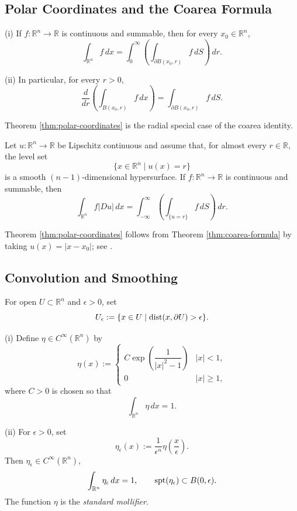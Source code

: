 \subsection{Polar Coordinates and the Coarea Formula}

\begin{theorem}
\label{thm:polar-coordinates}
(i) If $f:\mathbb R^n\to\mathbb R$ is continuous and summable, then for every $x_0\in\mathbb R^n$,
\[
\int_{\mathbb R^n}f\,dx
=\int_0^\infty
\left(\int_{\partial B(x_0,r)}f\,dS\right)\,dr.
\]

(ii) In particular, for every $r>0$,
\[
\frac d{dr}\left(\int_{B(x_0,r)}f\,dx\right)
=\int_{\partial B(x_0,r)}f\,dS.
\]
\end{theorem}

Theorem \ref{thm:polar-coordinates} is the radial special case of the coarea identity.

\begin{theorem}
\label{thm:coarea-formula}
Let $u:\mathbb R^n\to\mathbb R$ be Lipschitz continuous and assume that, for almost every $r\in\mathbb R$, the level set
\[
\{x\in\mathbb R^n\mid u(x)=r\}
\]
is a smooth $(n-1)$-dimensional hypersurface. If $f:\mathbb R^n\to\mathbb R$ is continuous and summable, then
\[
\int_{\mathbb R^n}f|Du|\,dx
=\int_{-\infty}^\infty
\left(\int_{\{u=r\}}f\,dS\right)\,dr.
\]
\end{theorem}

Theorem \ref{thm:polar-coordinates} follows from Theorem \ref{thm:coarea-formula} by taking $u(x)=|x-x_0|$; see \cite[Chapter 3]{EvansGariepy1992}.

\subsection{Convolution and Smoothing}

\begin{definition}
\label{def:epsilon-interior-set-notation}
For open $U\subset\mathbb R^n$ and $\epsilon>0$, set
\[
U_\epsilon
:=\{x\in U\mid\operatorname{dist}(x,\partial U)>\epsilon\}.
\]
\end{definition}

\begin{definition}
\label{def:standard-mollifier}
(i) Define $\eta\in C^\infty(\mathbb R^n)$ by
\[
\eta(x):=
\begin{cases}
C\exp\!\left(\dfrac{1}{|x|^2-1}\right) & |x|<1,\\
0 & |x|\geq1,
\end{cases}
\]
where $C>0$ is chosen so that
\[
\int_{\mathbb R^n}\eta\,dx=1.
\]

(ii) For $\epsilon>0$, set
\[
\eta_\epsilon(x)
:=\frac1{\epsilon^n}\eta\left(\frac x\epsilon\right).
\]
Then $\eta_\epsilon\in C^\infty(\mathbb R^n)$,
\[
\int_{\mathbb R^n}\eta_\epsilon\,dx=1,
\qquad
\operatorname{spt}(\eta_\epsilon)\subset B(0,\epsilon).
\]
The function $\eta$ is the \textit{standard mollifier}.
\end{definition}

